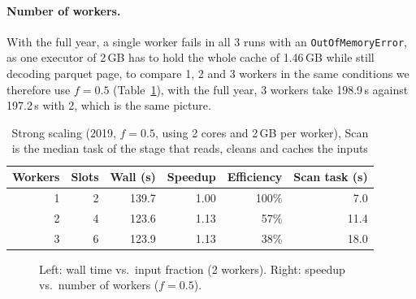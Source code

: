 \paragraph{Number of workers.}
With the full year, a single worker fails in all 3 runs with an \texttt{OutOfMemoryError}, as one
executor of 2\,GB has to hold the whole cache of 1.46\,GB while still decoding parquet page,
 to compare 1, 2 and 3 workers in the same conditions we therefore use $f=0.5$
(Table~\ref{tab:workers}), with the full year, 3 workers take 198.9\,s against 197.2\,s with 2,
which is the same picture.

\begin{table}[h]
  \caption{Strong scaling (2019, $f=0.5$, using 2 cores and 2\,GB per worker), Scan is the median task of
  the stage that reads, cleans and caches the inputs}
  \label{tab:workers}
  \small
  \begin{tabular}{rrrrrr}
    \toprule
    Workers & Slots & Wall (s) & Speedup & Efficiency & Scan task (s) \\
    \midrule
    1 & 2 & 139.7 & 1.00 & 100\% & 7.0 \\
    2 & 4 & 123.6 & 1.13 & 57\% & 11.4 \\
    3 & 6 & 123.9 & 1.13 & 38\% & 18.0 \\
    \bottomrule
  \end{tabular}
\end{table}

\begin{figure}[h]
  \centering
  \hfill
  \caption{Left: wall time vs.\ input fraction (2 workers). Right: speedup vs.\ number of
  workers ($f=0.5$).}
  \label{fig:scaling}
\end{figure}

